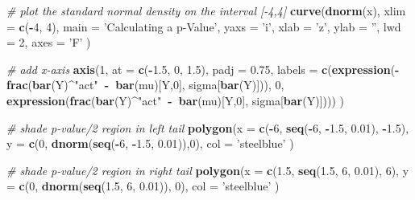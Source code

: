 \documentclass[]{book}
\newenvironment{Shaded}{\begin{snugshade}}{\end{snugshade}}
\newcommand{\KeywordTok}[1]{\textcolor[rgb]{0.13,0.29,0.53}{\textbf{#1}}}
\newcommand{\DataTypeTok}[1]{\textcolor[rgb]{0.13,0.29,0.53}{#1}}
\newcommand{\DecValTok}[1]{\textcolor[rgb]{0.00,0.00,0.81}{#1}}
\newcommand{\FloatTok}[1]{\textcolor[rgb]{0.00,0.00,0.81}{#1}}
\newcommand{\StringTok}[1]{\textcolor[rgb]{0.31,0.60,0.02}{#1}}
\newcommand{\CommentTok}[1]{\textcolor[rgb]{0.56,0.35,0.01}{\textit{#1}}}
\newcommand{\OperatorTok}[1]{\textcolor[rgb]{0.81,0.36,0.00}{\textbf{#1}}}
\newcommand{\ErrorTok}[1]{\textcolor[rgb]{0.64,0.00,0.00}{\textbf{#1}}}
\newcommand{\NormalTok}[1]{#1}
\theoremstyle{definition}
\theoremstyle{definition}
\theoremstyle{definition}
\theoremstyle{remark}
\begin{document}
\begin{Shaded}
\begin{Highlighting}[]
\CommentTok{# plot the standard normal density on the interval [-4,4]}
\KeywordTok{curve}\NormalTok{(}\KeywordTok{dnorm}\NormalTok{(x),}
      \DataTypeTok{xlim =} \KeywordTok{c}\NormalTok{(}\OperatorTok{-}\DecValTok{4}\NormalTok{, }\DecValTok{4}\NormalTok{),}
      \DataTypeTok{main =} \StringTok{'Calculating a p-Value'}\NormalTok{,}
      \DataTypeTok{yaxs =} \StringTok{'i'}\NormalTok{,}
      \DataTypeTok{xlab =} \StringTok{'z'}\NormalTok{,}
      \DataTypeTok{ylab =} \StringTok{''}\NormalTok{,}
      \DataTypeTok{lwd =} \DecValTok{2}\NormalTok{,}
      \DataTypeTok{axes =} \StringTok{'F'}
\NormalTok{      )}

\CommentTok{# add x-axis}
\KeywordTok{axis}\NormalTok{(}\DecValTok{1}\NormalTok{, }
     \DataTypeTok{at =} \KeywordTok{c}\NormalTok{(}\OperatorTok{-}\FloatTok{1.5}\NormalTok{, }\DecValTok{0}\NormalTok{, }\FloatTok{1.5}\NormalTok{), }
     \DataTypeTok{padj =} \FloatTok{0.75}\NormalTok{,}
     \DataTypeTok{labels =} \KeywordTok{c}\NormalTok{(}\KeywordTok{expression}\NormalTok{(}\OperatorTok{-}\KeywordTok{frac}\NormalTok{(}\KeywordTok{bar}\NormalTok{(Y)}\OperatorTok{^}\StringTok{"act"}\OperatorTok{~-}\ErrorTok{~}\KeywordTok{bar}\NormalTok{(mu)[Y,}\DecValTok{0}\NormalTok{], sigma[}\KeywordTok{bar}\NormalTok{(Y)])),}
                \DecValTok{0}\NormalTok{,}
                \KeywordTok{expression}\NormalTok{(}\KeywordTok{frac}\NormalTok{(}\KeywordTok{bar}\NormalTok{(Y)}\OperatorTok{^}\StringTok{"act"}\OperatorTok{~-}\ErrorTok{~}\KeywordTok{bar}\NormalTok{(mu)[Y,}\DecValTok{0}\NormalTok{], sigma[}\KeywordTok{bar}\NormalTok{(Y)])))}
\NormalTok{     )}

\CommentTok{# shade p-value/2 region in left tail}
\KeywordTok{polygon}\NormalTok{(}\DataTypeTok{x =} \KeywordTok{c}\NormalTok{(}\OperatorTok{-}\DecValTok{6}\NormalTok{, }\KeywordTok{seq}\NormalTok{(}\OperatorTok{-}\DecValTok{6}\NormalTok{, }\OperatorTok{-}\FloatTok{1.5}\NormalTok{, }\FloatTok{0.01}\NormalTok{), }\OperatorTok{-}\FloatTok{1.5}\NormalTok{),}
        \DataTypeTok{y =} \KeywordTok{c}\NormalTok{(}\DecValTok{0}\NormalTok{, }\KeywordTok{dnorm}\NormalTok{(}\KeywordTok{seq}\NormalTok{(}\OperatorTok{-}\DecValTok{6}\NormalTok{, }\OperatorTok{-}\FloatTok{1.5}\NormalTok{, }\FloatTok{0.01}\NormalTok{)),}\DecValTok{0}\NormalTok{), }
        \DataTypeTok{col =} \StringTok{'steelblue'}
\NormalTok{        )}

\CommentTok{# shade p-value/2 region in right tail}
\KeywordTok{polygon}\NormalTok{(}\DataTypeTok{x =} \KeywordTok{c}\NormalTok{(}\FloatTok{1.5}\NormalTok{, }\KeywordTok{seq}\NormalTok{(}\FloatTok{1.5}\NormalTok{, }\DecValTok{6}\NormalTok{, }\FloatTok{0.01}\NormalTok{), }\DecValTok{6}\NormalTok{),}
        \DataTypeTok{y =} \KeywordTok{c}\NormalTok{(}\DecValTok{0}\NormalTok{, }\KeywordTok{dnorm}\NormalTok{(}\KeywordTok{seq}\NormalTok{(}\FloatTok{1.5}\NormalTok{, }\DecValTok{6}\NormalTok{, }\FloatTok{0.01}\NormalTok{)), }\DecValTok{0}\NormalTok{), }
        \DataTypeTok{col =} \StringTok{'steelblue'}
\NormalTok{        )}
\end{Highlighting}
\end{Shaded}
\end{document}
